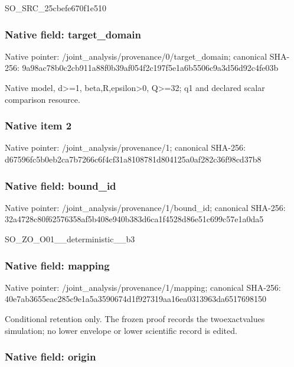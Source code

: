 \documentclass[10pt,a4paper]{article}
\begin{document}
SO\_SRC\_25cbefe670f1e510


\subsubsection{Native field: target\_domain}


Native pointer: /joint\_analysis/provenan\allowbreak{}ce/0/target\_domain; canonical SHA-256: 9a98ac78b0c2cb911a88f0b3\allowbreak{}9af054f2c197f5e1a6b5506c\allowbreak{}9a3d56d92c4fe03b


Native model, d>=1, beta,R,epsilon>0, Q>=32; q1 and declared scalar comparison resource.


\subsubsection{Native item 2}


Native pointer: /joint\_analysis/provenance/1; canonical SHA-256: d67596fc5b0eb2ca7b7266c6\allowbreak{}f4cf31a8108781d804125a0a\allowbreak{}f282c36f98cd37b8



\subsubsection{Native field: bound\_id}


Native pointer: /joint\_analysis/provenance/1/bound\_id; canonical SHA-256: 32a4728c80f62576358af5b4\allowbreak{}08e940b383d6ca1f4528d86e\allowbreak{}51c699c57e1a0da5


SO\_ZO\_O01\_\_deterministic\_\_b3


\subsubsection{Native field: mapping}


Native pointer: /joint\_analysis/provenance/1/mapping; canonical SHA-256: 40e7ab3655eac285c9e1a5a3\allowbreak{}590674d1f927319aa16ea031\allowbreak{}3963da6517698150


Conditional retention only. The frozen proof records the twoexactvalues simulation; no lower envelope or lower scientific record is edited.


\subsubsection{Native field: origin}
\end{document}
